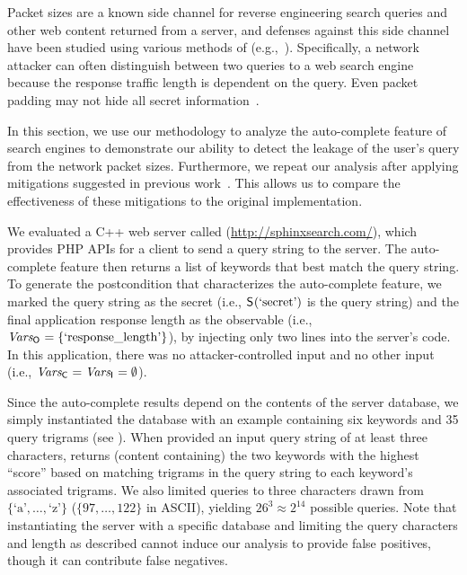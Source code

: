 Packet sizes are a known side channel for reverse engineering search
queries and other web content returned from a server, and defenses
against this side channel have been studied using various methods of
\QIF
(e.g.,~\cite{Kellaris:2016:GAS:2976749.2978386,sidebuster:ccs10,webTomorrow:sp10}).
Specifically, a network attacker can often distinguish between two
queries to a web search engine because the response traffic length is
dependent on the query.  Even packet padding may not hide all secret
information~\cite{trafficcounter}.

In this section, we use our methodology to analyze the auto-complete
feature of search engines to demonstrate our ability to detect the
leakage of the user's query from the network packet sizes.
Furthermore, we repeat our analysis after applying mitigations
suggested in previous work~\cite{trafficcounter}.  This allows us to
compare the effectiveness of these mitigations to the original
implementation.

We evaluated a C++ web server called \sphinx
(\url{http://sphinxsearch.com/}), which provides PHP APIs for a client
to send a query string to the server.  The auto-complete feature then
returns a list of keywords that best match the query string.  To
generate the postcondition that characterizes the auto-complete
feature, we marked the query string as the secret (i.e.,
$\mathsf{S}_{}(\textrm{`secret'})$ is the query string) and the final application
response length as the observable (i.e., $\mathit{Vars_{\mathsf{O}_{}}} =
\{\textrm{`\textrm{response\_length}'}\}$), by injecting only two
lines into the server's code.  In this application, there was no
attacker-controlled input and no other input (i.e., $\mathit{Vars_{\mathsf{C}_{}}} =
\mathit{Vars_{\mathsf{I}_{}}} = \emptyset$).

Since the auto-complete results depend on the contents of the server
database, we simply instantiated the database with an example
containing six keywords and 35 query trigrams (see
).  When provided an input query string of at
least three characters, \sphinx returns (content containing) the two
keywords with the highest ``score'' based on matching trigrams in the
query string to each keyword's associated trigrams.  We also limited
queries to three characters drawn from $\{\textrm{`a'}, \ldots,
\textrm{`z'}\}$ ($\{97,\ldots,122\}$ in ASCII), yielding $26^3 \approx
2^{14}$ possible queries.  Note that instantiating the server with a
specific database and limiting the query characters and length as
described cannot induce our analysis to provide false positives,
though it can contribute false negatives.

